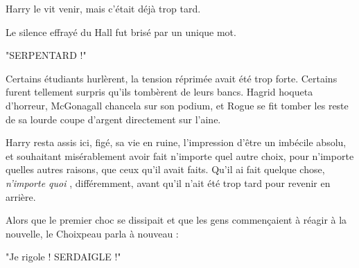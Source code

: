 Harry le vit venir, mais c'était déjà trop tard.

Le silence effrayé du Hall fut brisé par un unique mot.

"SERPENTARD !"

Certains étudiants hurlèrent, la tension réprimée avait été trop forte. Certains furent tellement surpris qu'ils tombèrent de leurs bancs. Hagrid hoqueta d'horreur, McGonagall chancela sur son podium, et Rogue se fit tomber les reste de sa lourde coupe d'argent directement sur l'aine.

Harry resta assis ici, figé, sa vie en ruine, l'impression d'être un imbécile absolu, et souhaitant misérablement avoir fait n'importe quel autre choix, pour n'importe quelles autres raisons, que ceux qu'il avait faits. Qu'il ai fait quelque chose,\emph{ n'importe quoi} , différemment, avant qu'il n'ait été trop tard pour revenir en arrière.

Alors que le premier choc se dissipait et que les gens commençaient à réagir à la nouvelle, le Choixpeau parla à nouveau :

"Je rigole ! SERDAIGLE !"

